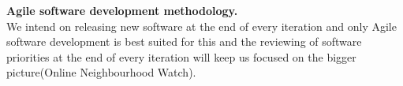 
\textbf{ \large Agile software development methodology.}
\newline \\  We intend on releasing new software at the end of every iteration and only Agile software development is best suited for this and the reviewing of software priorities at the end of every iteration will keep us focused on the bigger picture(Online Neighbourhood Watch). 
